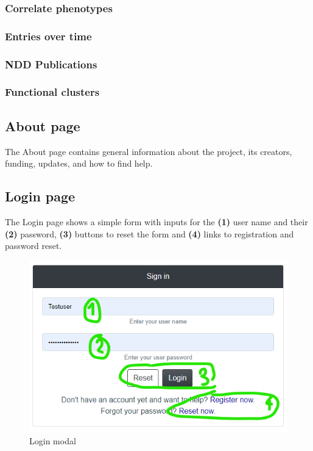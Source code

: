 \documentclass[
]{article}
\begin{document}
\hypertarget{correlate-phenotypes}{%
\subsubsection{Correlate phenotypes}\label{correlate-phenotypes}}

\hypertarget{entries-over-time}{%
\subsubsection{Entries over time}\label{entries-over-time}}

\hypertarget{ndd-publications}{%
\subsubsection{NDD Publications}\label{ndd-publications}}

\hypertarget{functional-clusters}{%
\subsubsection{Functional clusters}\label{functional-clusters}}

\hypertarget{about-page}{%
\subsection{About page}\label{about-page}}

The About page contains general information about the project, its creators, funding, updates, and how to find help.

\hypertarget{login-page}{%
\subsection{Login page}\label{login-page}}

The Login page shows a simple form with inputs for the \textbf{(1)} user name and their \textbf{(2)} password, \textbf{(3)} buttons to reset the form and \textbf{(4)} links to registration and password reset.

\begin{figure}
\centering
\includegraphics{./static/img/02_16-login-modal.png}
\caption{Login modal}
\end{figure}
\end{document}
